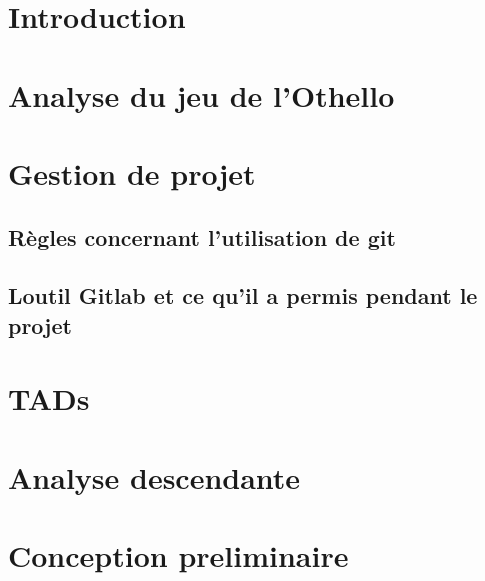 


  

  \newpage
  \tableofcontents

  \newpage
  \section{Introduction}
    

  \newpage
  \section{Analyse du jeu de l'Othello}
    

  \newpage
  \section{Gestion de projet}
    

    \subsection{Règles concernant l’utilisation de git}
      

    \subsection{Loutil Gitlab et ce qu'il a permis pendant le projet}
      


  \newpage
  \section{TADs}
    

  \newpage
  \section{Analyse descendante}
    
    

  \newpage
  \section{Conception preliminaire}
    
    
    

